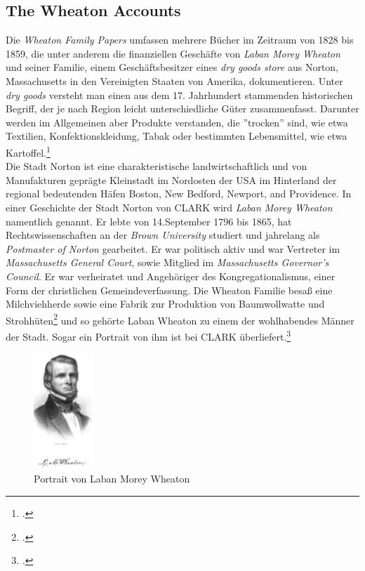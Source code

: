\documentclass[12pt,a4paper]{article}
\begin{document}
\subsection{The Wheaton Accounts}

Die \textit{Wheaton Family Papers} umfassen mehrere Bücher im Zeitraum von 1828 bis 1859, die unter anderem die finanziellen Geschäfte von \textit{Laban Morey Wheaton} und seiner Familie, einem Geschäftsbesitzer eines \textit{dry goods store} aus Norton, Massachusetts in den Vereinigten Staaten von Amerika, dokumentieren. Unter \textit{dry goods} versteht man einen aus dem 17. Jahrhundert stammenden historischen Begriff, der je nach Region leicht unterschiedliche Güter zusammenfasst. Darunter werden im Allgemeinen aber Produkte verstanden, die ''trocken'' sind, wie etwa Textilien, Konfektionskleidung, Tabak oder bestimmten Lebensmittel, wie etwa Kartoffel.\footcite[Definition von \textit{Dry Goods}, \protect\url{https://chestofbooks.com/reference/Dictionary-of-Dry-Goods/Dry-Goods.html}, 23.05.2019, Vgl.][]{cole2015complete}
\\
Die Stadt Norton ist eine charakteristische landwirtschaftlich und von Manufakturen geprägte Kleinstadt im Nordosten der USA im Hinterland der regional bedeutenden Häfen Boston, New Bedford, Newport, and Providence. In einer Geschichte der Stadt Norton von CLARK wird \textit{Laban Morey Wheaton} namentlich genannt. Er lebte von 14.September 1796 bis 1865, hat Rechtswissenschaften an der \textit{Brown University} studiert und jahrelang als \textit{Postmaster of Norton} gearbeitet. Er war politisch aktiv und war Vertreter im \textit{Massachusetts General Court}, sowie Mitglied im \textit{Massachusetts Governor's Council}. Er war verheiratet und Angehöriger des Kongregationalismus, einer Form der christlichen Gemeindeverfassung. Die Wheaton Familie besaß eine Milchviehherde sowie eine Fabrik zur Produktion von Baumwollwatte und Strohhüten\footcite[][S.6]{tomasek2013encoding} und so gehörte Laban Wheaton zu einem der wohlhabendes Männer der Stadt. Sogar ein Portrait von ihm ist bei CLARK überliefert.\footcite[][S.496]{clark1859history} 
\begin{figure}[H]
\centering
	\includegraphics[width=0.2\textwidth]{img/LMwheaton.jpg}  
    \caption[Portrait von Laban Morey Wheaton, Vgl. CLARK, George Faber: A History of the Town of Norton, Bristol County, Massachusetts, from 1669-1859.
Crosby, Nichols, and Company, and author at Norton, 1859, S.497.]{Portrait von Laban Morey Wheaton} \label{fig:LMwheaton}
\end{figure} 
\end{document}
